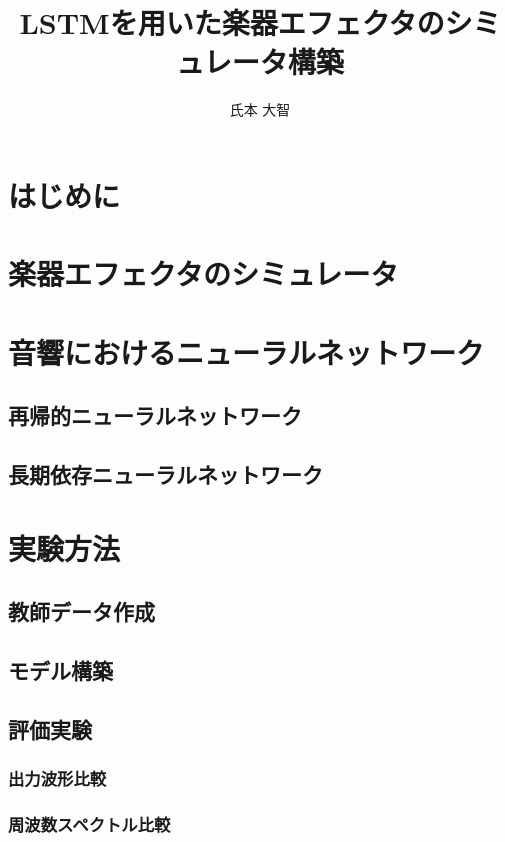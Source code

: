 \documentclass{jreport}		%
\title{LSTMを用いた楽器エフェクタのシミュレータ構築}	%
\author{氏本 大智}			%
\begin{document}
%
\maketitle		%
\tableofcontents	%

\chapter{はじめに}

\chapter{楽器エフェクタのシミュレータ}

\chapter{音響におけるニューラルネットワーク}
\section{再帰的ニューラルネットワーク}

\section{長期依存ニューラルネットワーク}

\chapter{実験方法}
\section{教師データ作成}

\section{モデル構築}

\section{評価実験}
\subsection{出力波形比較}

\subsection{周波数スペクトル比較}
\end{document}
